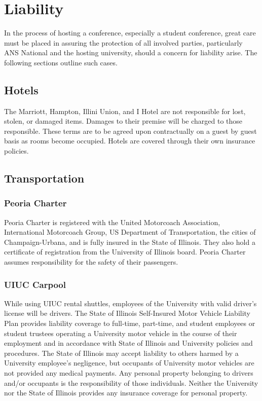 \section{Liability}
In the process of hosting a conference, especially a student conference, great care must be placed in assuring the protection of all involved parties, particularly ANS National and the hosting university,  should a concern for liability arise. The following sections outline such cases.



\subsection{Hotels}
The Marriott, Hampton, Illini Union, and I Hotel are not responsible for lost, stolen, or damaged items. Damages to their premise will be charged to those responsible. These terms are to be agreed upon contractually on a guest by guest basis as rooms become occupied. Hotels are covered through their own insurance policies.



\subsection{Transportation}

\subsubsection{Peoria Charter}
Peoria Charter is registered with the United Motorcoach Association, International Motorcoach Group, US Department of Transportation, the cities of Champaign-Urbana, and is fully insured in the State of Illinois. They also hold a certificate of registration from the University of Illinois board. Peoria Charter assumes responsibility for the safety of their passengers.

\subsubsection{UIUC Carpool}
While using UIUC rental shuttles, employees of the University with valid driver’s license will be drivers. The State of Illinois Self-Insured Motor Vehicle Liability Plan provides liability coverage to full-time, part-time, and student employees or student trustees operating a University motor vehicle in the course of their employment and in accordance with State of Illinois and University policies and procedures. The State of Illinois may accept liability to others harmed by a University employee's negligence, but occupants of University motor vehicles are not provided any medical payments. Any personal property belonging to drivers and/or occupants is the responsibility of those individuals. Neither the University nor the State of Illinois provides any insurance coverage for personal property.

